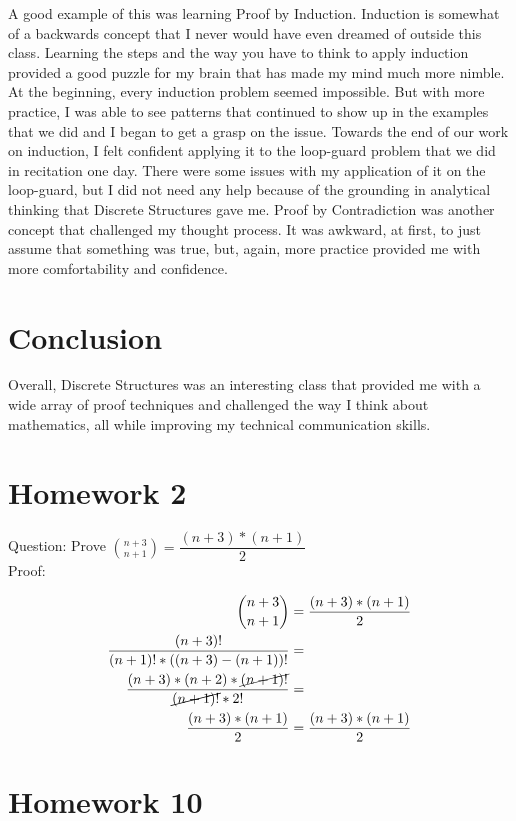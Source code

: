 \documentclass{article}
\begin{document}
A good example of this was learning Proof by Induction. Induction is somewhat of a backwards concept that I never would have even dreamed of outside this class. Learning the steps and the way you have to think to apply induction provided a good puzzle for my brain that has made my mind much more nimble. At the beginning, every induction problem seemed impossible. But with more practice, I was able to see patterns that continued to show up in the examples that we did and I began to get a grasp on the issue. Towards the end of our work on induction, I felt confident applying it to the loop-guard problem that we did in recitation one day. There were some issues with my application of it on the loop-guard, but I did not need any help because of the grounding in analytical thinking that Discrete Structures gave me. Proof by Contradiction was another concept that challenged my thought process. It was awkward, at first, to just assume that something was true, but, again, more practice provided me with more comfortability and confidence.

\section*{Conclusion}

Overall, Discrete Structures was an interesting class that provided me with a wide array of proof techniques and challenged the way I think about mathematics, all while improving my technical communication skills.

\newpage
\appendix
\section{Homework 2}

Question: Prove $\displaystyle \binom{n+3}{n+1}=\dfrac{(n+3)*(n+1)}{2}$
\\
Proof:
\begin{center}
	\begin{align*}
	\displaystyle \binom{n+3}{n+1}&=\dfrac{(n+3)*(n+1)}{2}\\
	\dfrac{(n+3)!}{(n+1)!*((n+3)-(n+1))!}&=\\
	\dfrac{(n+3)*(n+2)*\cancel{(n+1)!}}{\cancel{(n+1)!}*2!}&=\\
	\dfrac{(n+3)*(n+1)}{2}&=\dfrac{(n+3)*(n+1)}{2}
	\end{align*}
\end{center}

\section{Homework 10}
\end{document}
